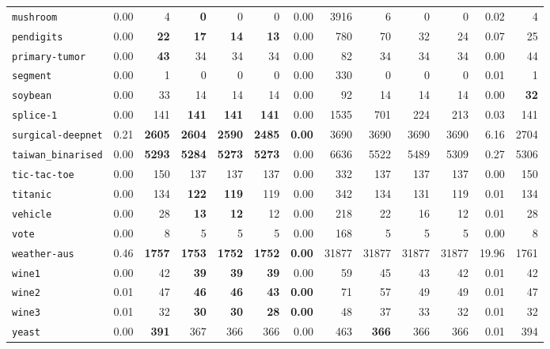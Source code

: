 \begin{tabular}{lrrrrrrrrrrrr}
\texttt{mushroom} & 0.00 & 4 & \textbf{0} & 0 & 0 & 0.00 & 3916 & 6 & 0 & 0 & 0.02 & 4\\
\texttt{pendigits} & 0.00 & \textbf{22} & \textbf{17} & \textbf{14} & \textbf{13} & 0.00 & 780 & 70 & 32 & 24 & 0.07 & 25\\
\texttt{primary-tumor} & 0.00 & \textbf{43} & 34 & 34 & 34 & 0.00 & 82 & 34 & 34 & 34 & 0.00 & 44\\
\texttt{segment} & 0.00 & 1 & 0 & 0 & 0 & 0.00 & 330 & 0 & 0 & 0 & 0.01 & 1\\
\texttt{soybean} & 0.00 & 33 & 14 & 14 & 14 & 0.00 & 92 & 14 & 14 & 14 & 0.00 & \textbf{32}\\
\texttt{splice-1} & 0.00 & 141 & \textbf{141} & \textbf{141} & \textbf{141} & 0.00 & 1535 & 701 & 224 & 213 & 0.03 & 141\\
\texttt{surgical-deepnet} & 0.21 & \textbf{2605} & \textbf{2604} & \textbf{2590} & \textbf{2485} & \textbf{0.00} & 3690 & 3690 & 3690 & 3690 & 6.16 & 2704\\
\texttt{taiwan\_binarised} & 0.00 & \textbf{5293} & \textbf{5284} & \textbf{5273} & \textbf{5273} & 0.00 & 6636 & 5522 & 5489 & 5309 & 0.27 & 5306\\
\texttt{tic-tac-toe} & 0.00 & 150 & 137 & 137 & 137 & 0.00 & 332 & 137 & 137 & 137 & 0.00 & 150\\
\texttt{titanic} & 0.00 & 134 & \textbf{122} & \textbf{119} & 119 & 0.00 & 342 & 134 & 131 & 119 & 0.01 & 134\\
\texttt{vehicle} & 0.00 & 28 & \textbf{13} & \textbf{12} & 12 & 0.00 & 218 & 22 & 16 & 12 & 0.01 & 28\\
\texttt{vote} & 0.00 & 8 & 5 & 5 & 5 & 0.00 & 168 & 5 & 5 & 5 & 0.00 & 8\\
\texttt{weather-aus} & 0.46 & \textbf{1757} & \textbf{1753} & \textbf{1752} & \textbf{1752} & \textbf{0.00} & 31877 & 31877 & 31877 & 31877 & 19.96 & 1761\\
\texttt{wine1} & 0.00 & 42 & \textbf{39} & \textbf{39} & \textbf{39} & 0.00 & 59 & 45 & 43 & 42 & 0.01 & 42\\
\texttt{wine2} & 0.01 & 47 & \textbf{46} & \textbf{46} & \textbf{43} & \textbf{0.00} & 71 & 57 & 49 & 49 & 0.01 & 47\\
\texttt{wine3} & 0.01 & 32 & \textbf{30} & \textbf{30} & \textbf{28} & \textbf{0.00} & 48 & 37 & 33 & 32 & 0.01 & 32\\
\texttt{yeast} & 0.00 & \textbf{391} & 367 & 366 & 366 & 0.00 & 463 & \textbf{366} & 366 & 366 & 0.01 & 394\\
\bottomrule
\end{tabular}
